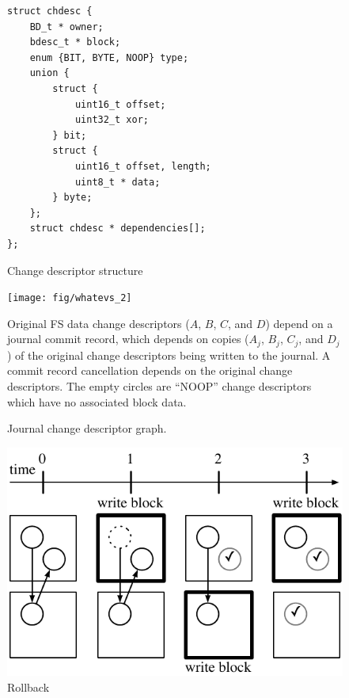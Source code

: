 \begin{figure}
\begin{verbatim}
struct chdesc {
    BD_t * owner;
    bdesc_t * block;
    enum {BIT, BYTE, NOOP} type;
    union {
        struct {
            uint16_t offset;
            uint32_t xor;
        } bit;
        struct {
            uint16_t offset, length;
            uint8_t * data;
        } byte;
    };
    struct chdesc * dependencies[];
};
\end{verbatim}
\caption{\label{fig:chdesc} Change descriptor structure}
\end{figure}

\begin{figure}
  \centering
  \texttt{[image: fig/whatevs\_2]}
  \caption{\label{fig:journal} Journal change descriptor graph.}{Original FS
  data change descriptors ($A$, $B$, $C$, and $D$) depend on a journal commit
  record, which depends on copies ($A_j$, $B_j$, $C_j$, and $D_j$) of the
  original change descriptors being written to the journal. A commit record
  cancellation depends on the original change descriptors. The empty circles are
  ``NOOP'' change descriptors which have no associated block data.}
\end{figure}

\begin{figure}
  \centering
  \includegraphics[width=\columnwidth]{rollback_sequence}
  \caption{\label{fig:rollback} Rollback}
\end{figure}

